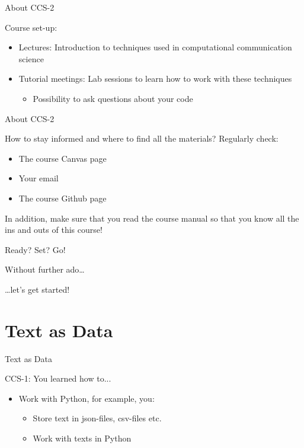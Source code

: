 \documentclass[handout]{beamer}
\begin{document}
\begin{frame}{About CCS-2} 
	
Course set-up:
\begin{itemize}
	\item Lectures: Introduction to techniques used in computational communication science
	\item Tutorial meetings: Lab sessions to learn how to work with these techniques
	\begin{itemize}
		\item Possibility to ask questions about your code
	\end{itemize}
\end{itemize}

\end{frame}


\begin{frame}{About CCS-2} 
	
	How to stay informed and where to find all the materials? Regularly check:	
	\begin{itemize}
		\item The course Canvas page
		\item Your email
		\item The course Github page
	\end{itemize}

	In addition, make sure that you read the course manual so that you know all the ins and outs of this course!

\end{frame}



\begin{frame}{Ready? Set? Go!} 
	
	Without further ado\dots
	
	\dots let's get started!
	
\end{frame}



\section{Text as Data}


\begin{frame}{Text as Data}
	
CCS-1: You learned how to...
	\begin{itemize}
	\item Work with Python, for example, you:
	\begin{itemize}
		\item Store text in json-files, csv-files etc.
		\item Work with texts in Python
	\end{itemize}
\end{itemize}
	
\end{frame}
\end{document}
